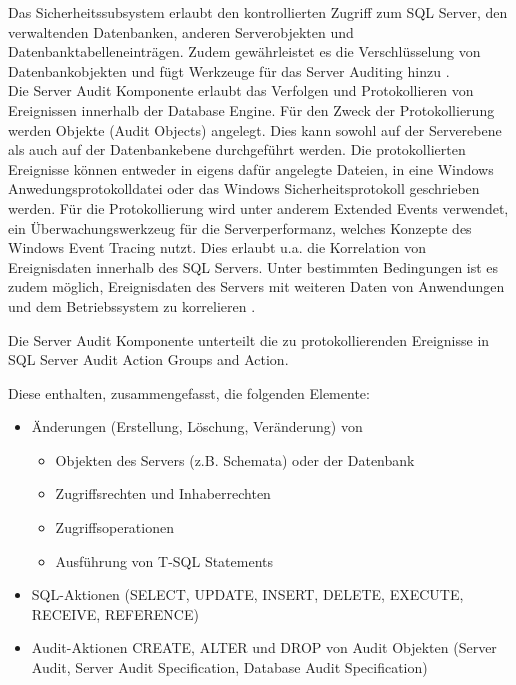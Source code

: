 Das Sicherheitssubsystem erlaubt den kontrollierten Zugriff zum SQL Server, den verwaltenden Datenbanken, anderen Serverobjekten und Datenbanktabelleneinträgen. Zudem gewährleistet es die Verschlüsselung von Datenbankobjekten und fügt Werkzeuge für das Server Auditing hinzu \citep{MSSQL4}. \\

Die Server Audit Komponente erlaubt das Verfolgen und Protokollieren von Ereignissen innerhalb der Database Engine. Für den Zweck der Protokollierung werden Objekte (Audit Objects) angelegt. Dies kann sowohl auf der Serverebene als auch auf der Datenbankebene durchgeführt werden. Die protokollierten Ereignisse können entweder in eigens dafür angelegte Dateien, in eine Windows Anwedungsprotokolldatei  oder das Windows Sicherheitsprotokoll geschrieben werden. Für die Protokollierung wird unter anderem \glqq Extended Events\grqq{} verwendet, ein Überwachungswerkzeug für die Serverperformanz, welches Konzepte des Windows Event Tracing nutzt. Dies erlaubt u.a. die Korrelation von Ereignisdaten innerhalb des SQL Servers. Unter bestimmten Bedingungen ist es zudem möglich, Ereignisdaten des Servers mit weiteren Daten von Anwendungen und dem Betriebssystem zu korrelieren \citep{MSSQL5}. 

Die Server Audit Komponente unterteilt die zu protokollierenden Ereignisse in \glqq SQL Server Audit Action Groups and Action\grqq \citep{MSSQL6}. 

Diese enthalten, zusammengefasst, die folgenden Elemente:
\begin{itemize}
\item Änderungen (Erstellung, Löschung, Veränderung) von
\begin{itemize}
\item Objekten des Servers (z.B. Schemata) oder der Datenbank
\item Zugriffsrechten und Inhaberrechten
\item Zugriffsoperationen
\item Ausführung von T-SQL Statements
\end{itemize}
\item SQL-Aktionen (SELECT, UPDATE, INSERT, DELETE, EXECUTE, RECEIVE, REFERENCE)
\item Audit-Aktionen CREATE, ALTER und DROP von Audit Objekten (Server Audit, Server Audit Specification, Database Audit Specification)
\end{itemize}


